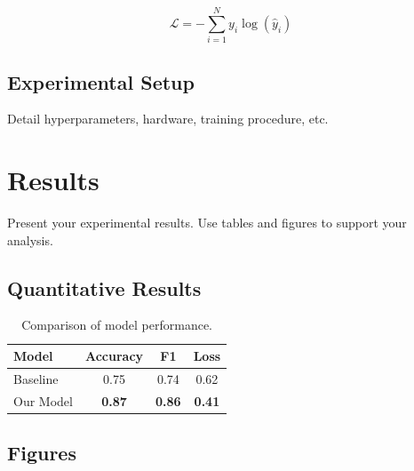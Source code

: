 \documentclass[12pt, a4paper]{article}
\begin{document}
\begin{equation}
  \mathcal{L} = -\sum_{i=1}^{N} y_i \log(\hat{y}_i)
  \label{eq:crossentropy}
\end{equation}

\subsection{Experimental Setup}

Detail hyperparameters, hardware, training procedure, etc.

\section{Results}
\label{sec:results}

Present your experimental results. Use tables and figures to
support your analysis.

\subsection{Quantitative Results}

\begin{table}[H]
  \centering
  
  \label{tab:results}
  \begin{tabular}{lccc}
    \toprule
    \textbf{Model} & \textbf{Accuracy} & \textbf{F1} & \textbf{Loss} \\
    \midrule
    Baseline        & 0.75              & 0.74        & 0.62          \\
    Our Model       & \textbf{0.87}     & \textbf{0.86} & \textbf{0.41} \\
    \bottomrule
  \end{tabular}
  \caption{Comparison of model performance.}
  \label{tab:results}
\end{table}

\subsection{Figures}

\end{document}
